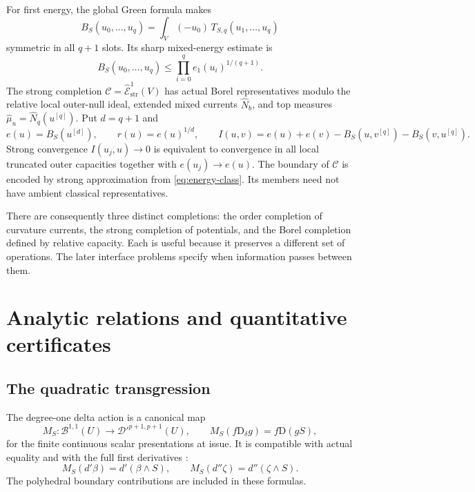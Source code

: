 \documentclass[11pt,a4paper]{article}
\newcommand{\MathEqref}[1]{{\hypersetup{linkcolor=EquationLink}\eqref{#1}}}
\theoremstyle{definition}
\theoremstyle{remark}
\numberwithin{equation}{section}
\newcommand{\D}{\mathrm D}
\newcommand{\str}{\mathrm{str}}
\newcommand{\B}{\mathscr B}
\newcommand{\C}{\mathscr C}
\begin{document}
For first energy, the global Green formula makes
\begin{equation}
 B_S(u_0,\ldots,u_q)
    =\int_V(-u_0)\,T_{S,q}(u_1,\ldots,u_q)
                         \label{eq:mixed-energy}
\end{equation}
symmetric in all $q+1$ slots.  Its sharp mixed-energy estimate is
\begin{equation}
 B_S(u_0,\ldots,u_q)
       \le\prod_{i=0}^{q}e_1(u_i)^{1/(q+1)}.
                         \label{eq:mixed-holder}
\end{equation}
The strong completion
$\C=\widehat{\mathcal E}^{1}_{\str}(V)$ has actual Borel
representatives modulo the relative local outer-null ideal, extended
mixed currents $\widehat N_b$, and top measures
$\widehat\mu_u=\widehat N_q(u^{[q]})$.  Put $d=q+1$ and
\begin{equation}
 e(u)=B_S(u^{[d]}),\qquad r(u)=e(u)^{1/d},\qquad
 I(u,v)=e(u)+e(v)-B_S(u,v^{[q]})-B_S(v,u^{[q]}).
                         \label{eq:strong-discrepancy}
\end{equation}
Strong convergence $I(u_j,u)\to0$ is equivalent to convergence in all
local truncated outer capacities together with $e(u_j)\to e(u)$.
The boundary of $\C$ is encoded by strong approximation from
\MathEqref{eq:energy-class}.  Its members need not have ambient
classical representatives.

There are consequently three distinct completions: the order
completion of curvature currents, the strong completion of potentials,
and the Borel completion defined by relative capacity.  Each is useful
because it preserves a different set of operations.  The later
interface problems specify when information passes between them.

\section{Analytic relations and quantitative certificates}
\label{sec:relations}

\subsection{The quadratic transgression}

The degree-one delta action is a canonical map
\begin{equation}
 M_S:\B^{1,1}(U)\longrightarrow\mathcal D'^{p+1,p+1}(U),
 \qquad M_S(f\D_\delta g)=f\D(gS),
                         \label{eq:degree-one-action}
\end{equation}
for the finite continuous scalar presentations at issue.  It is
compatible with actual equality and with the full first derivatives
\cite{Rchain,QA}:
\begin{equation}
 M_S(d'\beta)=d'(\beta\wedge S),\qquad
 M_S(d''\zeta)=d''(\zeta\wedge S).
                         \label{eq:first-derivative-action}
\end{equation}
The polyhedral boundary contributions are included in these formulas.
\end{document}
